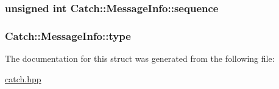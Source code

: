 \hypertarget{struct_catch_1_1_message_info_a7f4f57ea21e50160adefce7b68a781d6}{
\subsubsection[{sequence}]{\setlength{\rightskip}{0pt plus 5cm}unsigned int Catch\-::\-Message\-Info\-::sequence}}\label{struct_catch_1_1_message_info_a7f4f57ea21e50160adefce7b68a781d6}
\hypertarget{struct_catch_1_1_message_info_ae928b9117465c696e45951d9d0284e78}{
\subsubsection[{type}]{ Catch\-::\-Message\-Info\-::type}}\label{struct_catch_1_1_message_info_ae928b9117465c696e45951d9d0284e78}


The documentation for this struct was generated from the following file\-:\begin{DoxyCompactItemize}
\item 
\hyperlink{catch_8hpp}{catch.\-hpp}\end{DoxyCompactItemize}
